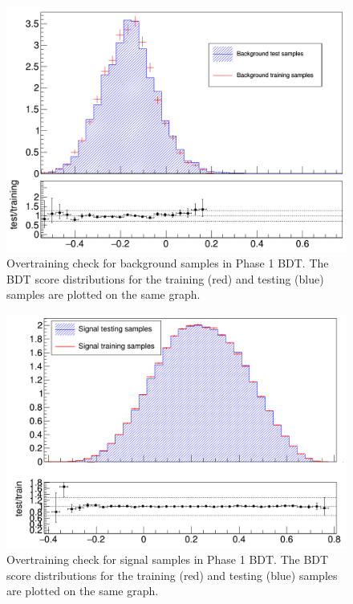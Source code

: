 \begin{figure}[h]
	\centering
	\includegraphics[width=0.9\linewidth]{Figures/Phase1BDT_bkgOTcheck}
	\caption[Overtraining check for background samples in Phase 1 BDT.]{Overtraining check for background samples in Phase 1 BDT.  The BDT score distributions for the training (red) and testing (blue) samples are plotted on the same graph.}
	\label{fig:phase1bdtbkgotcheck}
\end{figure}
\begin{figure}[h]
	\centering
	\includegraphics[width=0.9\linewidth]{Figures/Phase1BDT_signalOTcheck}
	\caption[Overtraining check for signal samples in Phase 1 BDT.]{Overtraining check for signal samples in Phase 1 BDT.  The BDT score distributions for the training (red) and testing (blue) samples are plotted on the same graph.}
	\label{fig:phase1bdtsignalotcheck}
\end{figure}

